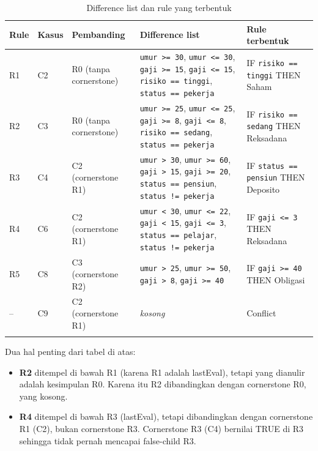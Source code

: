 \documentclass[11pt,a4paper]{article}
\newcommand{\cond}[1]{\texttt{#1}}
\begin{document}
{\small
\begin{longtable}{P{0.8cm}P{1.4cm}P{3.2cm}P{4.6cm}P{3.2cm}}
\toprule
\textbf{Rule} & \textbf{Kasus} & \textbf{Pembanding} & \textbf{Difference list} &
\textbf{Rule terbentuk} \\
\midrule
\endhead
R1 & C2 & R0 (tanpa cornerstone) & \cond{umur >= 30}, \cond{umur <= 30}, \cond{gaji >= 15},
  \cond{gaji <= 15}, \cond{risiko == tinggi}, \cond{status == pekerja} &
  IF \cond{risiko == tinggi} THEN Saham \\
R2 & C3 & R0 (tanpa cornerstone) & \cond{umur >= 25}, \cond{umur <= 25}, \cond{gaji >= 8},
  \cond{gaji <= 8}, \cond{risiko == sedang}, \cond{status == pekerja} &
  IF \cond{risiko == sedang} THEN Reksadana \\
R3 & C4 & C2 (cornerstone R1) & \cond{umur > 30}, \cond{umur >= 60}, \cond{gaji > 15},
  \cond{gaji >= 20}, \cond{status == pensiun}, \cond{status != pekerja} &
  IF \cond{status == pensiun} THEN Deposito \\
R4 & C6 & C2 (cornerstone R1) & \cond{umur < 30}, \cond{umur <= 22}, \cond{gaji < 15},
  \cond{gaji <= 3}, \cond{status == pelajar}, \cond{status != pekerja} &
  IF \cond{gaji <= 3} THEN Reksadana \\
R5 & C8 & C3 (cornerstone R2) & \cond{umur > 25}, \cond{umur >= 50}, \cond{gaji > 8},
  \cond{gaji >= 40} & IF \cond{gaji >= 40} THEN Obligasi \\
-- & C9 & C2 (cornerstone R1) & \emph{kosong} & Conflict \\
\bottomrule
\caption{Difference list dan rule yang terbentuk}
\label{tab:diff}
\end{longtable}
}

Dua hal penting dari tabel di atas:
\begin{itemize}[nosep]
  \item \textbf{R2} ditempel di bawah R1 (karena R1 adalah lastEval), tetapi yang dianulir
        adalah kesimpulan R0. Karena itu R2 dibandingkan dengan cornerstone R0, yang kosong.
  \item \textbf{R4} ditempel di bawah R3 (lastEval), tetapi dibandingkan dengan cornerstone R1
        (C2), bukan cornerstone R3. Cornerstone R3 (C4) bernilai TRUE di R3 sehingga tidak
        pernah mencapai false-child R3.
\end{itemize}
\end{document}
